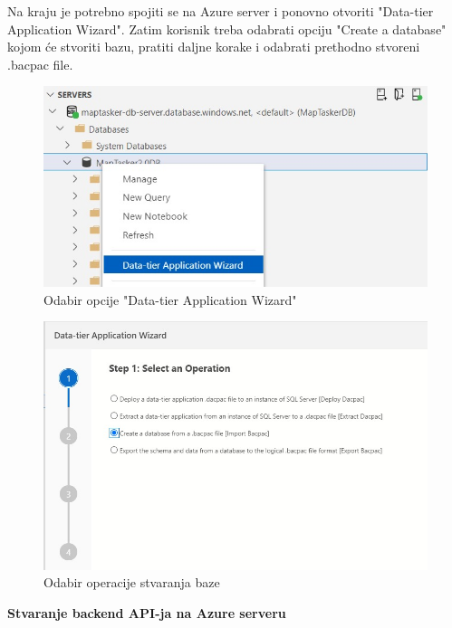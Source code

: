 			\noindent Na kraju je potrebno spojiti se na Azure server i ponovno otvoriti "Data-tier Application Wizard". Zatim korisnik treba odabrati opciju "Create a database" kojom će stvoriti bazu, pratiti daljne korake i odabrati prethodno stvoreni .bacpac file.
	
			\vspace{10mm}
	
			\begin{figure}[H]
				 \includegraphics[width=\linewidth]{./slike/baza5.jpg}
				  \centering
				  \caption{Odabir opcije "Data-tier Application Wizard"}
			  \end{figure}
	
			\vspace{10mm}
	
			\begin{figure}[H]
				 \includegraphics[width=\linewidth]{./slike/baza6.jpg}
				  \centering
				  \caption{Odabir operacije stvaranja baze}
			  \end{figure}
	
			\noindent\textbf{Stvaranje backend API-ja na Azure serveru}
	
